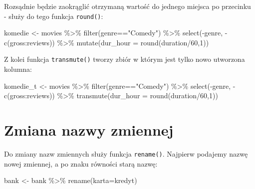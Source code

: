 \documentclass[
  letterpaper,
  DIV=11,
  numbers=noendperiod]{scrreprt}
\newenvironment{Shaded}{\begin{snugshade}}{\end{snugshade}}
\newcommand{\AttributeTok}[1]{\textcolor[rgb]{0.40,0.45,0.13}{#1}}
\newcommand{\DecValTok}[1]{\textcolor[rgb]{0.68,0.00,0.00}{#1}}
\newcommand{\FunctionTok}[1]{\textcolor[rgb]{0.28,0.35,0.67}{#1}}
\newcommand{\NormalTok}[1]{\textcolor[rgb]{0.00,0.23,0.31}{#1}}
\newcommand{\OtherTok}[1]{\textcolor[rgb]{0.00,0.23,0.31}{#1}}
\newcommand{\SpecialCharTok}[1]{\textcolor[rgb]{0.37,0.37,0.37}{#1}}
\newcommand{\StringTok}[1]{\textcolor[rgb]{0.13,0.47,0.30}{#1}}
\begin{document}
Rozsądnie będzie zaokrąglić otrzymaną wartość do jednego miejsca po
przecinku - służy do tego funkcja \texttt{round()}:

\begin{Shaded}
\begin{Highlighting}[]
\NormalTok{komedie }\OtherTok{\textless{}{-}}\NormalTok{ movies }\SpecialCharTok{\%\textgreater{}\%}
  \FunctionTok{filter}\NormalTok{(genre}\SpecialCharTok{==}\StringTok{"Comedy"}\NormalTok{) }\SpecialCharTok{\%\textgreater{}\%}
  \FunctionTok{select}\NormalTok{(}\SpecialCharTok{{-}}\NormalTok{genre, }\SpecialCharTok{{-}}\FunctionTok{c}\NormalTok{(gross}\SpecialCharTok{:}\NormalTok{reviews)) }\SpecialCharTok{\%\textgreater{}\%}
  \FunctionTok{mutate}\NormalTok{(}\AttributeTok{dur\_hour =} \FunctionTok{round}\NormalTok{(duration}\SpecialCharTok{/}\DecValTok{60}\NormalTok{,}\DecValTok{1}\NormalTok{))}
\end{Highlighting}
\end{Shaded}

Z kolei funkcja \texttt{transmute()} tworzy zbiór w którym jest tylko
nowo utworzona kolumna:

\begin{Shaded}
\begin{Highlighting}[]
\NormalTok{komedie\_t }\OtherTok{\textless{}{-}}\NormalTok{ movies }\SpecialCharTok{\%\textgreater{}\%}
  \FunctionTok{filter}\NormalTok{(genre}\SpecialCharTok{==}\StringTok{"Comedy"}\NormalTok{) }\SpecialCharTok{\%\textgreater{}\%}
  \FunctionTok{select}\NormalTok{(}\SpecialCharTok{{-}}\NormalTok{genre, }\SpecialCharTok{{-}}\FunctionTok{c}\NormalTok{(gross}\SpecialCharTok{:}\NormalTok{reviews)) }\SpecialCharTok{\%\textgreater{}\%}
  \FunctionTok{transmute}\NormalTok{(}\AttributeTok{dur\_hour =} \FunctionTok{round}\NormalTok{(duration}\SpecialCharTok{/}\DecValTok{60}\NormalTok{,}\DecValTok{1}\NormalTok{))}
\end{Highlighting}
\end{Shaded}

\hypertarget{zmiana-nazwy-zmiennej}{%
\section{Zmiana nazwy zmiennej}\label{zmiana-nazwy-zmiennej}}

Do zmiany nazw zmiennych służy funkcja \texttt{rename()}. Najpierw
podajemy nazwę nowej zmiennej, a po znaku równości starą nazwę:

\begin{Shaded}
\begin{Highlighting}[]
\NormalTok{bank }\OtherTok{\textless{}{-}}\NormalTok{ bank }\SpecialCharTok{\%\textgreater{}\%}
  \FunctionTok{rename}\NormalTok{(}\AttributeTok{karta=}\NormalTok{kredyt)}
\end{Highlighting}
\end{Shaded}
\end{document}
